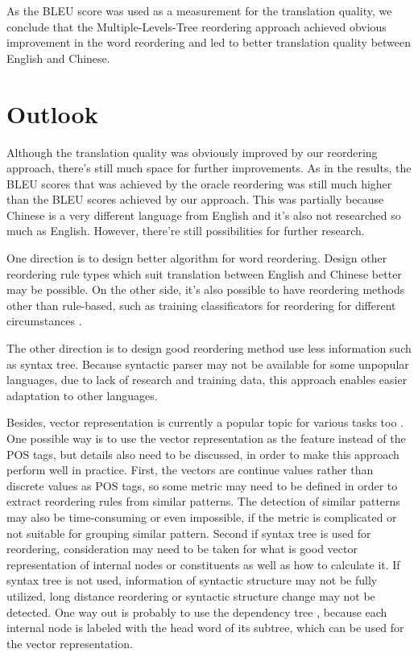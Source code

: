 As the \ac{BLEU} score was used as a measurement for the translation quality, we conclude that the Multiple-Levels-Tree reordering approach achieved obvious improvement in the word reordering and led to better translation quality between English and Chinese.

\section{Outlook}
\label{ch:Discussion:sec:Outlook}

Although the translation quality was obviously improved by our reordering approach, there's still much space for further improvements. As in the results, the \ac{BLEU} scores that was achieved by the oracle reordering was still much higher than the \ac{BLEU} scores achieved by our approach. This was partially because Chinese is a very different language from English and it's also not researched so much as English. However, there're still possibilities for further research.

One direction is to design better algorithm for word reordering. Design other reordering rule types which suit translation between English and Chinese better may be possible. On the other side, it's also possible to have reordering methods other than rule-based, such as training classificators for reordering for different circumstances \citep{google}.

The other direction is to design good reordering method use less information such as syntax tree. Because syntactic parser may not be available for some unpopular languages, due to lack of research and training data, this approach enables easier adaptation to other languages.

Besides, vector representation is currently a popular topic for various tasks too \citep{oxford, Mikolov}. One possible way is to use the vector representation as the feature instead of the \ac{POS} tags, but details also need to be discussed, in order to make this approach perform well in practice. First, the vectors are continue values rather than discrete values as \ac{POS} tags, so some metric may need to be defined in order to extract reordering rules from similar patterns. The detection of similar patterns may also be time-consuming or even impossible, if the metric is complicated or not suitable for grouping similar pattern. Second if syntax tree is used for reordering, consideration may need to be taken for what is good vector representation of internal nodes or constituents as well as how to calculate it. If syntax tree is not used, information of syntactic structure may not be fully utilized, long distance reordering or syntactic structure change may not be detected. One way out is probably to use the dependency tree \citep{depend}, because each internal node is labeled with the head word of its subtree, which can be used for the vector representation. 

